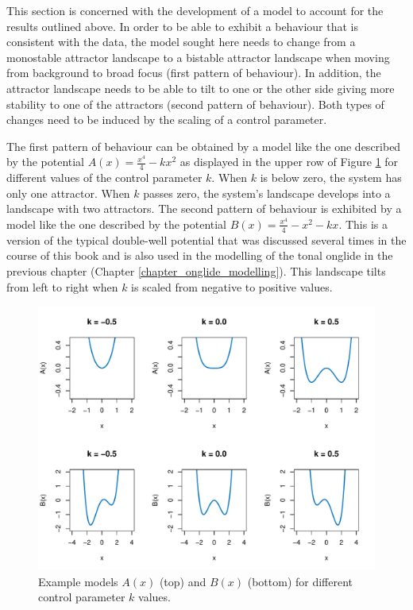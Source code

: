 This section is concerned with the development of a model to account for the results outlined above. In order to be able to exhibit a behaviour that is consistent with the data, the model sought here needs to change from a monostable attractor landscape to a bistable attractor landscape when moving from background to broad focus (first pattern of behaviour). In addition, the attractor landscape needs to be able to tilt to one or the other side giving more stability to one of the attractors (second pattern of behaviour). Both types of changes need to be induced by the scaling of a control parameter.

The first pattern of behaviour can be obtained by a model like the one described by the potential $A(x) = \frac{x^4}{4} - kx^2$ as displayed in the upper row of Figure \ref{fig:example_models} for different values of the control parameter $k$. When $k$ is below zero, the system has only one attractor. When $k$ passes zero, the system's landscape develops into a landscape with two attractors. The second pattern of behaviour is exhibited by a model like the one described by the potential $B(x) = \frac{x^4}{4} - x^2 - kx$. This is a version of the typical double-well potential that was discussed several times in the course of this book and is also used in the modelling of the tonal onglide in the previous chapter (Chapter \ref{chapter_onglide_modelling}). This landscape tilts from left to right when $k$ is scaled from negative to positive values.

\begin{figure}[htbp]
\begin{center}
\includegraphics[width=\textwidth]{figures/ch7/example_models.pdf}
\caption[Example models $A(x)$ and $B(x)$.]{Example models $A(x)$ (top) and $B(x)$ (bottom) for different control parameter $k$ values.}
\label{fig:example_models}
\end{center}
\end{figure}

